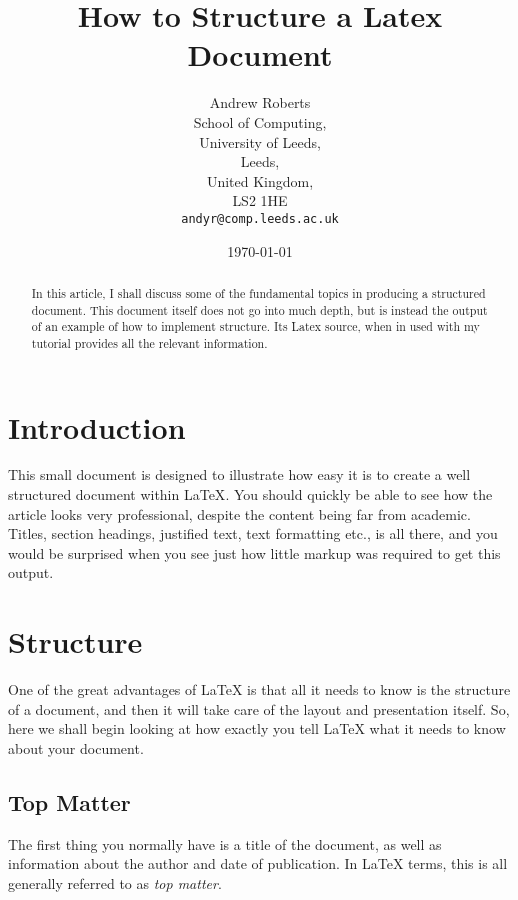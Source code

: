 \documentclass{article}
\begin{document}
	
	\title{How to Structure a Latex Document} %
	\author{Andrew Roberts\\
		School of Computing,\\
		University of Leeds,\\
		Leeds,\\
		United Kingdom,\\
		LS2 1HE\\
		\texttt{andyr@comp.leeds.ac.uk}}  %
	\date{\today}  %
	\maketitle
	
	\begin{abstract}
		In this article, I shall discuss some of the fundamental topics in
		producing a structured document.  This document itself does not go into
		much depth, but is instead the output of an example of how to implement
		structure. Its Latex source, when in used with my tutorial
		provides all the relevant information.  \end{abstract}
	
	\section{Introduction}
	This small document is designed to illustrate how easy it is to create a
	well structured document within \LaTeX\cite{lamport94}.  You should quickly be able to
	see how the article looks very professional, despite the content being
	far from academic.  Titles, section headings, justified text, text
	formatting etc., is all there, and you would be surprised when you see
	just how little markup was required to get this output.
	
	\section{Structure}
	One of the great advantages of \LaTeX{} is that all it needs to know is
	the structure of a document, and then it will take care of the layout
	and presentation itself.  So, here we shall begin looking at how exactly
	you tell \LaTeX{} what it needs to know about your document.
	
	\subsection{Top Matter}
	The first thing you normally have is a title of the document, as well as
	information about the author and date of publication.  In \LaTeX{} terms,
	this is all generally referred to as \emph{top matter}.
	
\end{document}

